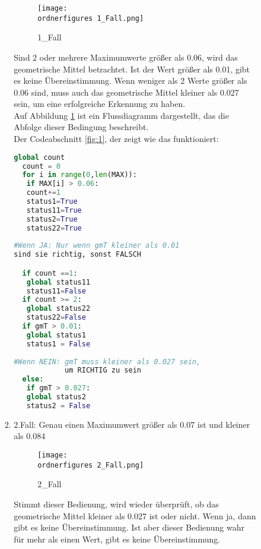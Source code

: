 \begin{enumerate}
\begin{itemize}
\begin{enumerate}
\begin{enumerate}
				\begin{figure}[H]
				\centering
				\texttt{[image: \\ordnerfigures 1\_Fall.png]}
				\caption{1\_Fall}
				\label{fig:1_Fall}
			\end{figure}
			
			Sind 2 oder mehrere Maximumwerte größer als 0.06, wird das geometrische Mittel betrachtet. Ist der Wert größer als 0.01, gibt es keine Übereinstimmung. Wenn weniger als 2 Werte größer als 0.06 sind, muss auch das geometrische Mittel kleiner als 0.027 sein, um eine erfolgreiche Erkennung zu haben. \\
			
			Auf Abbildung \ref{fig:1_Fall} ist ein Flussdiagramm dargestellt, das die Abfolge dieser Bedingung beschreibt.\\
			
		Der Codeabschnitt \ref{fig:1}, der zeigt wie das funktioniert:\\
			
\begin{lstlisting}[caption={1.Fall},label={fig:1}, language=Python]
  global count
  count = 0
  for i in range(0,len(MAX)):
   if MAX[i] > 0.06:
   count+=1
   status1=True
   status11=True
   status2=True
   status22=True
				
#Wenn JA: Nur wenn gmT kleiner als 0.01 
sind sie richtig, sonst FALSCH

  if count ==1:
   global status11
   status11=False
  if count >= 2:
   global status22
   status22=False
  if gmT > 0.01:
   global status1
   status1 = False
				
#Wenn NEIN: gmT muss kleiner als 0.027 sein,
			um RICHTIG zu sein
  else:
   if gmT > 0.027:
   global status2
   status2 = False
\end{lstlisting}
	
			
			\item 2.Fall: Genau einen Maximumwert größer als 0.07 ist und kleiner als 0.084 \\
			
				\begin{figure}[H]
				\centering
				\texttt{[image: \\ordnerfigures 2\_Fall.png]}
				\caption{2\_Fall}
				\label{fig:2_Fall}
			\end{figure}
			
			Stimmt dieser Bedienung, wird wieder überprüft, ob das geometrische Mittel kleiner als 0.027 ist oder nicht. Wenn ja, dann gibt es keine Übereinstimmung. Ist aber dieser Bedienung wahr für mehr als einen Wert, gibt es keine Übereinstimmung. \\
			

\end{enumerate}
\end{enumerate}
\end{itemize}
\end{enumerate}
